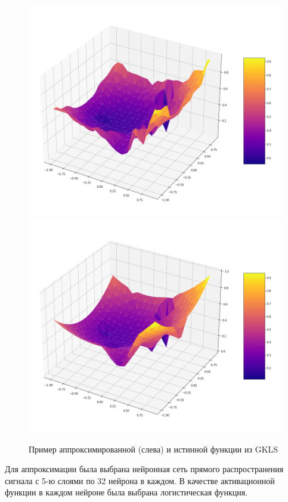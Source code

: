 \documentclass[11pt, oneside, a4paper]{article}
\begin{document}
\begin{figure}[h]
	\begin{center}
			\includegraphics[scale=0.25]{figure/approximate}
			\includegraphics[scale=0.25]{figure/true}			
			\caption{Пример аппроксимированной (слева) и истинной функции из GKLS} %
            \label{fio_ris1}
	\end{center}
\end{figure}


Для аппроксимации была выбрана нейронная сеть прямого распространения сигнала с 5-ю слоями по 32 нейрона в каждом. В качестве активационной функции в каждом нейроне была выбрана логистическая функция. 
\end{document}
